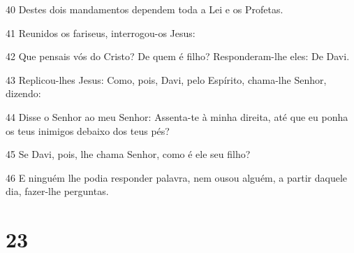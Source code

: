 \par 40 Destes dois mandamentos dependem toda a Lei e os Profetas.
\par 41 Reunidos os fariseus, interrogou-os Jesus:
\par 42 Que pensais vós do Cristo? De quem é filho? Responderam-lhe eles: De Davi.
\par 43 Replicou-lhes Jesus: Como, pois, Davi, pelo Espírito, chama-lhe Senhor, dizendo:
\par 44 Disse o Senhor ao meu Senhor: Assenta-te à minha direita, até que eu ponha os teus inimigos debaixo dos teus pés?
\par 45 Se Davi, pois, lhe chama Senhor, como é ele seu filho?
\par 46 E ninguém lhe podia responder palavra, nem ousou alguém, a partir daquele dia, fazer-lhe perguntas.

\chapter{23}

